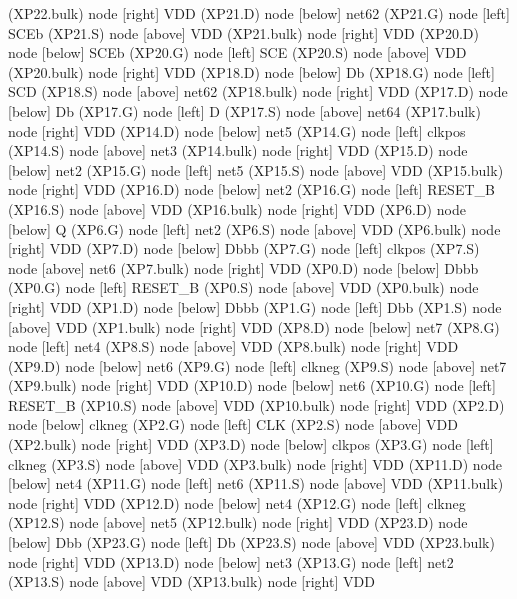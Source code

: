 \begin{circuitikz}[american]
	(XP22.bulk) node [right]	{VDD}
	(XP21.D) node [below]	{net62}
	(XP21.G) node [left]	{SCEb}
	(XP21.S) node [above]	{VDD}
	(XP21.bulk) node [right]	{VDD}
	(XP20.D) node [below]	{SCEb}
	(XP20.G) node [left]	{SCE}
	(XP20.S) node [above]	{VDD}
	(XP20.bulk) node [right]	{VDD}
	(XP18.D) node [below]	{Db}
	(XP18.G) node [left]	{SCD}
	(XP18.S) node [above]	{net62}
	(XP18.bulk) node [right]	{VDD}
	(XP17.D) node [below]	{Db}
	(XP17.G) node [left]	{D}
	(XP17.S) node [above]	{net64}
	(XP17.bulk) node [right]	{VDD}
	(XP14.D) node [below]	{net5}
	(XP14.G) node [left]	{clkpos}
	(XP14.S) node [above]	{net3}
	(XP14.bulk) node [right]	{VDD}
	(XP15.D) node [below]	{net2}
	(XP15.G) node [left]	{net5}
	(XP15.S) node [above]	{VDD}
	(XP15.bulk) node [right]	{VDD}
	(XP16.D) node [below]	{net2}
	(XP16.G) node [left]	{RESET_B}
	(XP16.S) node [above]	{VDD}
	(XP16.bulk) node [right]	{VDD}
	(XP6.D) node [below]	{Q}
	(XP6.G) node [left]	{net2}
	(XP6.S) node [above]	{VDD}
	(XP6.bulk) node [right]	{VDD}
	(XP7.D) node [below]	{Dbbb}
	(XP7.G) node [left]	{clkpos}
	(XP7.S) node [above]	{net6}
	(XP7.bulk) node [right]	{VDD}
	(XP0.D) node [below]	{Dbbb}
	(XP0.G) node [left]	{RESET_B}
	(XP0.S) node [above]	{VDD}
	(XP0.bulk) node [right]	{VDD}
	(XP1.D) node [below]	{Dbbb}
	(XP1.G) node [left]	{Dbb}
	(XP1.S) node [above]	{VDD}
	(XP1.bulk) node [right]	{VDD}
	(XP8.D) node [below]	{net7}
	(XP8.G) node [left]	{net4}
	(XP8.S) node [above]	{VDD}
	(XP8.bulk) node [right]	{VDD}
	(XP9.D) node [below]	{net6}
	(XP9.G) node [left]	{clkneg}
	(XP9.S) node [above]	{net7}
	(XP9.bulk) node [right]	{VDD}
	(XP10.D) node [below]	{net6}
	(XP10.G) node [left]	{RESET_B}
	(XP10.S) node [above]	{VDD}
	(XP10.bulk) node [right]	{VDD}
	(XP2.D) node [below]	{clkneg}
	(XP2.G) node [left]	{CLK}
	(XP2.S) node [above]	{VDD}
	(XP2.bulk) node [right]	{VDD}
	(XP3.D) node [below]	{clkpos}
	(XP3.G) node [left]	{clkneg}
	(XP3.S) node [above]	{VDD}
	(XP3.bulk) node [right]	{VDD}
	(XP11.D) node [below]	{net4}
	(XP11.G) node [left]	{net6}
	(XP11.S) node [above]	{VDD}
	(XP11.bulk) node [right]	{VDD}
	(XP12.D) node [below]	{net4}
	(XP12.G) node [left]	{clkneg}
	(XP12.S) node [above]	{net5}
	(XP12.bulk) node [right]	{VDD}
	(XP23.D) node [below]	{Dbb}
	(XP23.G) node [left]	{Db}
	(XP23.S) node [above]	{VDD}
	(XP23.bulk) node [right]	{VDD}
	(XP13.D) node [below]	{net3}
	(XP13.G) node [left]	{net2}
	(XP13.S) node [above]	{VDD}
	(XP13.bulk) node [right]	{VDD}
\fi




\end{circuitikz}
